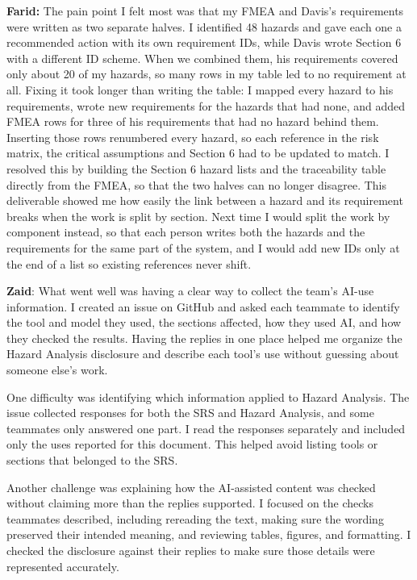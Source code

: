 \documentclass{article}
\begin{document}
\noindent\textbf{Farid:} The pain point I felt most was that my FMEA and Davis's
requirements were written as two separate halves. I identified 48 hazards and
gave each one a recommended action with its own requirement IDs, while Davis
wrote Section 6 with a different ID scheme. When we combined them, his
requirements covered only about 20 of my hazards, so many rows in my table led
to no requirement at all. Fixing it took longer than writing the table: I
mapped every hazard to his requirements, wrote new requirements for the hazards
that had none, and added FMEA rows for three of his requirements that had no
hazard behind them. Inserting those rows renumbered every hazard, so each
reference in the risk matrix, the critical assumptions and Section 6 had to be
updated to match. I resolved this by building the Section 6 hazard lists and
the traceability table directly from the FMEA, so that the two halves can no
longer disagree. This deliverable showed me how easily the link between a
hazard and its requirement breaks when the work is split by section. Next time
I would split the work by component instead, so that each person writes both
the hazards and the requirements for the same part of the system, and I would
add new IDs only at the end of a list so existing references never shift.

\bigskip
\noindent
\textbf{Zaid}:
What went well was having a clear way to collect the team's AI-use information. I created an issue on GitHub and asked each teammate to identify the tool and model they used, the sections affected, how they used AI, and how they checked the results. Having the replies in one place helped me organize the Hazard Analysis disclosure and describe each tool's use without guessing about someone else's work.

One difficulty was identifying which information applied to Hazard Analysis. The issue collected responses for both the SRS and Hazard Analysis, and some teammates only answered one part. I read the responses separately and included only the uses reported for this document. This helped avoid listing tools or sections that belonged to the SRS.

Another challenge was explaining how the AI-assisted content was checked without claiming more than the replies supported. I focused on the checks teammates described, including rereading the text, making sure the wording preserved their intended meaning, and reviewing tables, figures, and formatting. I checked the disclosure against their replies to make sure those details were represented accurately.
\end{document}
